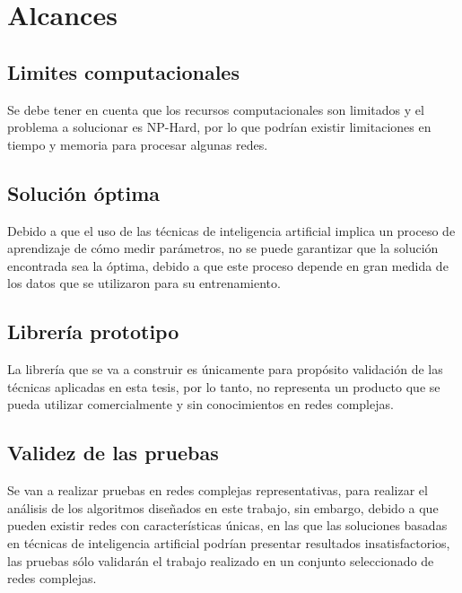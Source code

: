 \section{Alcances}

\subsection{Limites computacionales}
Se debe tener en cuenta que los recursos computacionales son limitados y el problema a solucionar es NP-Hard, por lo que podrían existir limitaciones en tiempo y memoria para procesar algunas redes.

\subsection{Solución óptima}
Debido a que el uso de las técnicas de inteligencia artificial implica un proceso de aprendizaje de cómo medir parámetros, no se puede garantizar que la solución encontrada sea la
óptima, debido a que este proceso depende en gran medida de los datos que se utilizaron para
su entrenamiento.
\subsection{Librería prototipo}

La librería que se va a construir es únicamente para propósito validación de las técnicas aplicadas en esta tesis, por lo tanto, no representa un producto que se pueda utilizar comercialmente y sin conocimientos en redes complejas.
\subsection{Validez de las pruebas}

Se van a realizar pruebas en redes complejas representativas, para realizar el análisis de los algoritmos diseñados en este trabajo, sin embargo, debido a que pueden existir redes con características únicas, en las que las soluciones basadas en técnicas de inteligencia artificial podrían presentar resultados insatisfactorios, las pruebas sólo validarán el trabajo realizado en un conjunto seleccionado de redes complejas.

